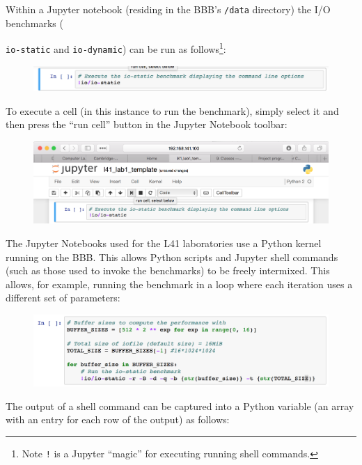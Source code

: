 \documentclass[a4paper,10pt]{article}
\newcommand{\code}[1]{\texttt{\small #1}}
\begin{document}
Within a Jupyter notebook (residing in the BBB's \code{/data} directory) the
I/O benchmarks ({\code{io-static} and \code{io-dynamic}) can be run as
follows\footnote{Note \code{!} is a Jupyter ``magic'' for executing running
shell commands.}:

\begin{figure}[H]
\includegraphics[width=\linewidth]{jupyter_running_benchmark.png}
\end{figure}

To execute a cell (in this instance to run the benchmark), simply select it and
then press the ``run cell'' button in the Jupyter Notebook toolbar:

\begin{figure}[H]
\includegraphics[width=\linewidth]{jupyter_run_cell.png}
\end{figure}

The Jupyter Notebooks used for the L41 laboratories use a Python kernel running
on the BBB. This allows Python scripts and Jupyter shell commands
(such as those used to invoke the benchmarks) to be freely intermixed. This 
allows, for example, running the benchmark in a loop where each
iteration uses a different set of parameters:

\begin{figure}[H]
\includegraphics[width=\linewidth]{jupyter_running_benchmark_loop.png}
\end{figure}

The output of a shell command can be captured into a Python variable (an array
with an entry for each row of the output) as follows:

}
\end{document}
